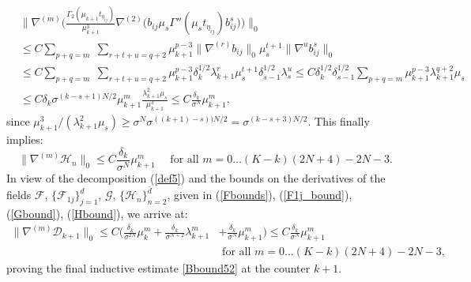 \documentclass[reqno,twoside,11pt]{amsart}
\numberwithin{equation}{section}
\theoremstyle{plain}
\theoremstyle{definition}
\begin{document}
\begin{equation*}
\begin{split}
& \big\|\nabla^{(m)}\Big(\frac{\Gamma_2(\mu_{k+1}t_{\eta_{ij}})}{\mu_{k+1}^3}
\nabla^{(2)}\big( b_{ij}\mu_s \Gamma''(\mu_s t_{\eta_{ij}})b_{ij}^s\big)
\Big)\big\|_0\\ & \leq C\sum_{p+q=m}\; \sum_{r+t+u=q+2} \mu_{k+1}^{p-3}\|\nabla^{(r)}b_{ij}\|_0
\mu_s^{t+1} \|\nabla^{u}b^s_{ij}\|_0 \\ & \leq C\sum_{p+q=m}
\; \sum_{r+t+u=q+2} \mu_{k+1}^{p-3}
\delta_k^{1/2}\lambda_{k+1}^r\mu_s^{t+1} \delta_{s-1}^{1/2}\lambda_s^u 
\leq C \delta_k^{1/2}\delta_{s-1}^{1/2} \sum_{p+q=m}\mu_{k+1}^{p-3}\lambda_{k+1}^{q+2}\mu_s
\\ & \leq C \delta_k \sigma^{(k-s+1)N/2}\mu_{k+1}^m\frac{\lambda_{k+1}^2\mu_s}{\mu_{k+1}^3}
\leq C\frac{\delta_k}{\sigma^N}\mu_{k+1}^m,
\end{split}
\end{equation*}
since  $\mu_{k+1}^3/(\lambda_{k+1}^2\mu_s)\geq 
\sigma^{N}\sigma^{((k+1)-s))N/2}= \sigma^{(k-s+3)N/2}$. This finally implies:
\begin{equation}\label{Hbound}
\|\nabla^{(m)}\mathcal{H}_n\|_0\leq C
\frac{\delta_k}{\sigma^N}\mu_{k+1}^m \quad \mbox{ for all } m =0\ldots (K-k)(2N+4)-2N-3.
\end{equation}
In view of the decomposition (\ref{def5}) and  the bounds on the
derivatives of the fields $\mathcal{F}$,
$\{\mathcal{F}_{1j}\}_{j=1}^d$, $\mathcal{G}$, $\{\mathcal{H}_n\}_{n=2}^{\bar d}$, 
given in (\ref{Fbounds}), (\ref{F1j_bound}), (\ref{Gbound}),
(\ref{Hbound}), we arrive at:
\begin{equation*}
\begin{split}
\|\nabla^{(m)}\mathcal{D}_{k+1}\|_0\leq C\Big(
\frac{\delta_k}{\sigma^{2N}}\mu_k^m + \frac{\delta_k}{\sigma^{N+2}}\lambda_{k+1}^m 
& + \frac{\delta_k}{\sigma^N}\mu_{k+1}^m \Big)\leq
C\frac{\delta_k}{\sigma^N}\mu_{k+1}^m  \\ & \mbox{ for all } m =0\ldots (K-k)(2N+4)-2N-3,
\end{split}
\end{equation*}
proving the final inductive estimate \ref{Bbound52} at the counter $k+1$.

\medskip
\end{document}
